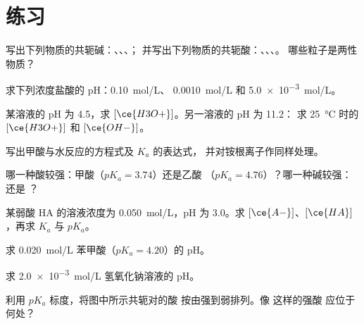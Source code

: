 \section{练习}

\begin{exercise}[$\star$]\label{exo:g12:ka-and-pka:1}
写出下列物质的共轭碱：、、、；
并写出下列物质的共轭酸：、、、。
哪些粒子是两性物质？
\end{exercise}

\begin{exercise}[$\star$]\label{exo:g12:ka-and-pka:2}
求下列浓度盐酸的 pH：\qty{0.10}{mol/L}、
\qty{0.0010}{mol/L} 和 \qty{5.0e-3}{mol/L}。
\end{exercise}

\begin{exercise}[$\star$]\label{exo:g12:ka-and-pka:3}
某溶液的 pH 为 4.5，求 $[\ce{H3O+}]$。另一溶液的 pH 为 11.2：
求 \qty{25}{\celsius} 时的 $[\ce{H3O+}]$ 和 $[\ce{OH-}]$。
\end{exercise}

\begin{exercise}[$\star$]\label{exo:g12:ka-and-pka:4}
写出甲酸与水反应的方程式及 $K_a$ 的表达式，
并对铵根离子作同样处理。
\end{exercise}

\begin{exercise}[$\star$]\label{exo:g12:ka-and-pka:5}
哪一种酸较强：甲酸（$pK_a = 3.74$）还是乙酸
（$pK_a = 4.76$）？哪一种碱较强： 还是
？
\end{exercise}

\begin{exercise}[$\star\star$]\label{exo:g12:ka-and-pka:6}
某弱酸 HA 的溶液浓度为 \qty{0.050}{mol/L}，pH 为 3.0。求
$[\ce{A-}]$、$[\ce{HA}]$，再求 $K_a$ 与 $pK_a$。
\end{exercise}

\begin{exercise}[$\star\star$]\label{exo:g12:ka-and-pka:7}
求 \qty{0.020}{mol/L} 苯甲酸（$pK_a = 4.20$）的 pH。
\end{exercise}

\begin{exercise}[$\star\star$]\label{exo:g12:ka-and-pka:8}
求 \qty{2.0e-3}{mol/L} 氢氧化钠溶液的 pH。
\end{exercise}

\begin{exercise}[$\star\star$]\label{exo:g12:ka-and-pka:9}
利用 $pK_a$ 标度，将图中所示共轭对的酸
按由强到弱排列。像  这样的强酸
应位于何处？
\end{exercise}

